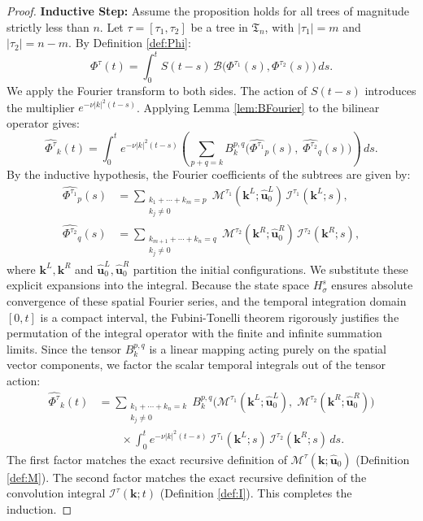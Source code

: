 \documentclass[12pt,a4paper]{article}
\theoremstyle{plain}
\theoremstyle{definition}
\theoremstyle{remark}
\newcommand{\BB}{\mathcal{B}}
\newcommand{\MM}{\mathcal{M}}
\newcommand{\II}{\mathcal{I}}
\newcommand{\fT}{\mathfrak{T}}
\begin{document}
\begin{proof}
\noindent\textbf{Inductive Step:} Assume the proposition holds for all trees of magnitude strictly less than $n$. Let $\tau = [\tau_1,\tau_2]$ be a tree in $\fT_n$, with $|\tau_1|=m$ and $|\tau_2|=n-m$. By Definition \ref{def:Phi}:
\[
  \Phi^\tau(t) = \int_0^t S(t-s)\,\BB\big(\Phi^{\tau_1}(s),\Phi^{\tau_2}(s)\big)\,ds.
\]
We apply the Fourier transform to both sides. The action of $S(t-s)$ introduces the multiplier $e^{-\nu|k|^2(t-s)}$. Applying Lemma \ref{lem:BFourier} to the bilinear operator gives:
\[
  \widehat{\Phi^\tau}_k(t)
  = \int_0^t e^{-\nu|k|^2(t-s)} \left(
  \sum_{p+q=k} B_k^{p,q}\!\Big( \widehat{\Phi^{\tau_1}}_p(s),\; \widehat{\Phi^{\tau_2}}_q(s) \Big) \right)\,ds.
\]
By the inductive hypothesis, the Fourier coefficients of the subtrees are given by:
\begin{align*}
  \widehat{\Phi^{\tau_1}}_p(s)
  &= \sum_{\substack{k_1+\cdots+k_m=p\\k_j\neq 0}}
  \MM^{\tau_1}(\mathbf{k}^L;\hat{\mathbf{u}}_0^L)\, \II^{\tau_1}(\mathbf{k}^L;s),
  \\
  \widehat{\Phi^{\tau_2}}_q(s)
  &= \sum_{\substack{k_{m+1}+\cdots+k_n=q\\k_j\neq 0}}
  \MM^{\tau_2}(\mathbf{k}^R;\hat{\mathbf{u}}_0^R)\, \II^{\tau_2}(\mathbf{k}^R;s),
\end{align*}
where $\mathbf{k}^L, \mathbf{k}^R$ and $\hat{\mathbf{u}}_0^L, \hat{\mathbf{u}}_0^R$ partition the initial configurations. We substitute these explicit expansions into the integral. Because the state space $H^s_\sigma$ ensures absolute convergence of these spatial Fourier series, and the temporal integration domain $[0,t]$ is a compact interval, the Fubini-Tonelli theorem rigorously justifies the permutation of the integral operator with the finite and infinite summation limits. Since the tensor $B_k^{p,q}$ is a linear mapping acting purely on the spatial vector components, we factor the scalar temporal integrals out of the tensor action:
\begin{align*}
  \widehat{\Phi^\tau}_k(t)
  &= \sum_{\substack{k_1+\cdots+k_n=k\\k_j\neq 0}}
  B_k^{p,q}\!\big( \MM^{\tau_1}(\mathbf{k}^L;\hat{\mathbf{u}}_0^L),\; \MM^{\tau_2}(\mathbf{k}^R;\hat{\mathbf{u}}_0^R) \big)
  \\
  &\qquad\times
  \int_0^t e^{-\nu|k|^2(t-s)}\, \II^{\tau_1}(\mathbf{k}^L;s)\, \II^{\tau_2}(\mathbf{k}^R;s)\,ds.
\end{align*}
The first factor matches the exact recursive definition of $\MM^\tau(\mathbf{k};\hat{\mathbf{u}}_0)$ (Definition \ref{def:M}). The second factor matches the exact recursive definition of the convolution integral $\II^\tau(\mathbf{k};t)$ (Definition \ref{def:I}). This completes the induction.
\end{proof}
\end{document}
